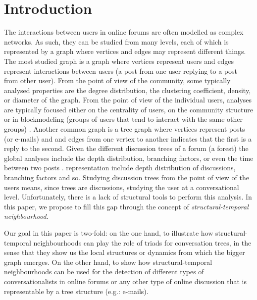 \documentclass[conference]{IEEEtran}
\begin{document}
\section{Introduction}
The interactions between users in online forums are often modelled as complex networks. As such, they can be studied from many levels, each of which is represented by a graph where vertices and edges may represent different things. The most studied graph is a graph where vertices represent users and edges represent interactions between users (a post from one user replying to a post from other user). From the point of view of the community, some typically analysed properties are the degree distribution, the clustering coefficient, density, or diameter of the graph. From the point of view of the individual users, analyses are typically focused either on the centrality of users, on the community structure or in blockmodeling (groups of users that tend to interact with the same other groups) \cite{McCallum2007a}. Another common graph is a tree graph where vertices represent posts (or e-mails) and and edges from one vertex to another indicates that the first is a reply to the second. Given the different discussion trees of a forum (a forest) the global analyses include the depth distribution, branching factors, or even the time between two posts \cite{Bhatt2012}. representation include depth distribution of discussions, branching factors and so. Studying discussion trees from the point of view of the users means, since trees are discussions, studying the user at a conversational level. Unfortunately, there is a lack of structural tools to perform this analysis. In this paper, we propose to fill this gap through the concept of \textit{structural-temporal neighbourhood}.  

Our goal in this paper is two-fold: on the one hand, to illustrate how structural-temporal neighbourhoods can play the role of triads for conversation trees, in the sense that they show us the local structures or dynamics from which the bigger graph emerges. On the other hand, to show how structural-temporal neighbourhoods can be used for the detection of different types of conversationalists in online forums or any other type of online discussion that is representable by a tree structure (e.g.: e-mails).
\end{document}
